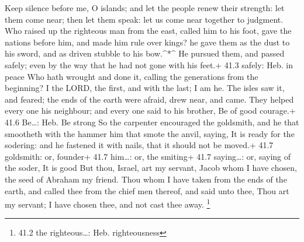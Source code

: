  Keep silence before me, O islands; and let the people renew
their strength: let them come near; then let them speak: let us come
near together to judgment.  Who raised up the righteous man
from the east, called him to his foot, gave the nations before him, and
made him rule over kings? he gave them as the dust to his sword, and as
driven stubble to his bow.\^{}*\^{}  He pursued them, and
passed safely; even by the way that he had not gone with his feet.+ 41.3
safely: Heb. in peace  Who hath wrought and done it, calling
the generations from the beginning? I the LORD, the first, and with the
last; I am he.  The isles saw it, and feared; the ends of
the earth were afraid, drew near, and came.  They helped
every one his neighbour; and every one said to his brother, Be of good
courage.+ 41.6 Be\ldots: Heb. Be strong  So the carpenter
encouraged the goldsmith, and he that smootheth with the hammer him that
smote the anvil, saying, It is ready for the sodering: and he fastened
it with nails, that it should not be moved.+ 41.7 goldsmith: or,
founder+ 41.7 him\ldots: or, the smiting+ 41.7 saying\ldots: or, saying
of the soder, It is good  But thou, Israel, art my servant,
Jacob whom I have chosen, the seed of Abraham my friend. 
Thou whom I have taken from the ends of the earth, and called thee from
the chief men thereof, and said unto thee, Thou art my servant; I have
chosen thee, and not cast thee away. \footnote{41.2 the righteous\ldots:
  Heb. righteousness}

